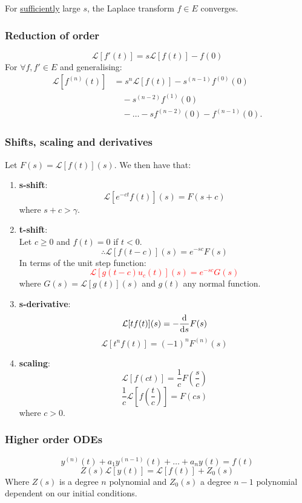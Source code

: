 \documentclass{article}
\begin{document}
\begin{multicols}{3}
For \underline{sufficiently} large $s$, the Laplace transform
$f\in E$ converges.

\newpage

\subsubsection*{Reduction of order}
$$\mathcal{L}[f'(t)]=s\mathcal{L}[f(t)]-f(0)$$
For $\forall f,f'\in E$ and generalising:
\begin{align*}
    \mathcal{L}[f^{(n)}(t)]
    &=s^n\mathcal{L}[f(t)]
    -s^{(n-1)}f^{(0)}(0) \\
    &\quad-s^{(n-2)}f^{(1)}(0) \\
    &\quad-\dots-sf^{(n-2)}(0)-f^{(n-1)}(0).
\end{align*}

\subsubsection*{Shifts, scaling and derivatives}
Let $F(s)=\mathcal{L}[f(t)](s)$.
We then have that:
\begin{enumerate}
    \item \textbf{s-shift}:
    $$\mathcal{L}[e^{-ct}f(t)](s)=F(s+c)$$
    where $s+c>\gamma$.
    \item \textbf{t-shift}: \\
    Let $c\geq0$ and $f(t)=0$ if $t<0$.
    $$\therefore\mathcal{L}[f(t-c)](s)=e^{-sc}F(s)$$
    In terms of the unit step function:
    \textcolor{red}{$$\mathcal{L}
    [g(t-c)u_c(t)](s)=e^{-sc}G(s)$$}where $G(s)=\mathcal{L}[g(t)](s)$
    and $g(t)$ any normal function.

    \item \textbf{s-derivative}:
    $$\mathcal{L}[tf(t)](s)=-\dv{s}F(s)$$
    $$\mathcal{L}[t^n f(t)]
    =(-1)^n F^{(n)}(s)$$

    \item \textbf{scaling}:
    $$\mathcal{L}[f(ct)]=\frac{1}{c}F(\frac{s}{c})$$
    $$\frac{1}{c}\mathcal{L}[f(\frac{t}{c})]=F(cs)$$
    where $c>0$.
\end{enumerate}

\subsubsection*{Higher order ODEs}
$$y^{(n)}(t)+a_1y^{(n-1)}(t)+\dots
+a_n y(t)=f(t)$$
$$Z(s)\mathcal{L}[y(t)]
=\mathcal{L}[f(t)]+Z_0(s)$$
Where $Z(s)$ is a degree $n$ polynomial
and $Z_0(s)$ a degree $n-1$ polynomial dependent on our 
initial conditions.


\end{multicols}
\end{document}
